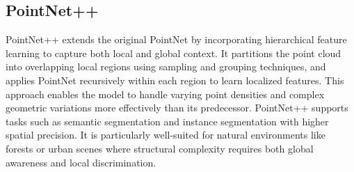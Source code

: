 \documentclass[../report.tex]{subfiles}
\begin{document}
    \subsection{PointNet++}
    
    PointNet++\cite{PointNet++} extends the original PointNet by incorporating hierarchical feature learning to capture both local and global context. It partitions the point cloud into overlapping local regions using sampling and grouping techniques, and applies PointNet recursively within each region to learn localized features. This approach enables the model to handle varying point densities and complex geometric variations more effectively than its predecessor. PointNet++ supports tasks such as semantic segmentation and instance segmentation with higher spatial precision. It is particularly well-suited for natural environments like forests or urban scenes where structural complexity requires both global awareness and local discrimination.
    
\end{document}
